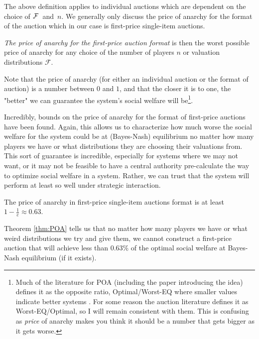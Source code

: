 \documentclass[12pt,twoside]{reedthesis}
\begin{document}
The above definition applies to individual auctions which are dependent on the choice  of $\mathcal{F}$~and~$n$. We generally only discuss the price of anarchy for the format of the auction which in our case is first-price single-item auctions.

\begin{dfn}  
{\em The price of anarchy for the first-price auction format} is then the worst possible price of anarchy for any choice of the number of players $n$ or valuation distributions $\mathcal{F}$.
\label{dfn:FormatPOA}
\end{dfn}

Note that the price of anarchy (for either an individual auction or the format of auction) is a number between $0$ and $1$, and that the closer it is to one, the "better" we can guarantee the system's social welfare will be\footnote{Much of the literature for POA (including the paper introducing the idea) defines it as the opposite ratio, Optimal/Worst-EQ where smaller values indicate better systems \citep{Koutsoupias1999}. For some reason the auction literature defines it as Worst-EQ/Optimal, so I will remain consistent with them. This is confusing as {\em price} of anarchy makes you think it should be a number that gets bigger as it gets worse.}.

Incredibly, bounds on the price of anarchy for the format of first-price auctions have been found. Again, this allows us to characterize how much worse the social welfare for the system could be at (Bayes-Nash) equilibrium no matter how many players we have or what distributions they are choosing their valuations from. This sort of guarantee is incredible, especially for systems where we may not want, or it may not be feasible to have a central authority pre-calculate the way to optimize social welfare in a system. Rather, we can trust that the system will perform at least so well under strategic interaction.

\begin{theorem}{\citep{Syrgkanis2013}}
	The price of anarchy in first-price single-item auctions format is at least $1-\frac{1}{e} \approx 0.63$.
	\label{thm:POA}	
\end{theorem}

Theorem \ref{thm:POA} tells us that no matter  how many players we have or what weird distributions we try and give them, we cannot construct a first-price auction that will achieve less than $0.63$\% of the optimal social welfare at Bayes-Nash equilibrium (if it exists). 
 
\end{document}
